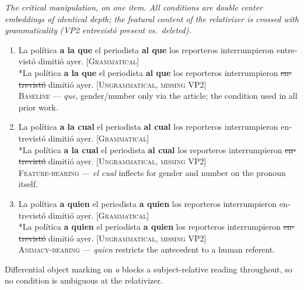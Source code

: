 \documentclass[12pt]{article}
\newcommand{\es}[1]{\foreignlanguage{spanish}{\textit{#1}}}
\newcommand{\rel}[1]{\textbf{#1}}
\begin{document}
\textit{The critical manipulation, on one item. All conditions are double center embeddings of identical depth; the featural content of the relativizer is crossed with grammaticality (VP2 \es{entrevistó} present vs.\ deleted).}

\begin{enumerate}[label=(\alph*),leftmargin=2.2em,itemsep=0.6em]
  \item \foreignlanguage{spanish}{La política \rel{a la que} el periodista \rel{al que} los reporteros interrumpieron entrevistó dimitió ayer.} {\color{muted}\small\textsc{[Grammatical]}}\\
        \foreignlanguage{spanish}{*La política \rel{a la que} el periodista \rel{al que} los reporteros interrumpieron \sout{entrevistó} dimitió ayer.} {\color{muted}\small\textsc{[Ungrammatical, missing VP2]}}\\
  {\color{muted}\small\textsc{Baseline} --- \es{que}, gender/number only via the article; the condition used in all prior work.}
  \item \foreignlanguage{spanish}{La política \rel{a la cual} el periodista \rel{al cual} los reporteros interrumpieron entrevistó dimitió ayer.} {\color{muted}\small\textsc{[Grammatical]}}\\
        \foreignlanguage{spanish}{*La política \rel{a la cual} el periodista \rel{al cual} los reporteros interrumpieron \sout{entrevistó} dimitió ayer.} {\color{muted}\small\textsc{[Ungrammatical, missing VP2]}}\\
  {\color{muted}\small\textsc{Feature-bearing} --- \es{el cual} inflects for gender and number on the pronoun itself.}
  \item \foreignlanguage{spanish}{La política \rel{a quien} el periodista \rel{a quien} los reporteros interrumpieron entrevistó dimitió ayer.} {\color{muted}\small\textsc{[Grammatical]}}\\
        \foreignlanguage{spanish}{*La política \rel{a quien} el periodista \rel{a quien} los reporteros interrumpieron \sout{entrevistó} dimitió ayer.} {\color{muted}\small\textsc{[Ungrammatical, missing VP2]}}\\
  {\color{muted}\small\textsc{Animacy-bearing} --- \es{quien} restricts the antecedent to a human referent.}
\end{enumerate}

{\small Differential object marking on \es{a} blocks a subject-relative reading throughout, so no condition is ambiguous at the relativizer.\par}
\end{document}
